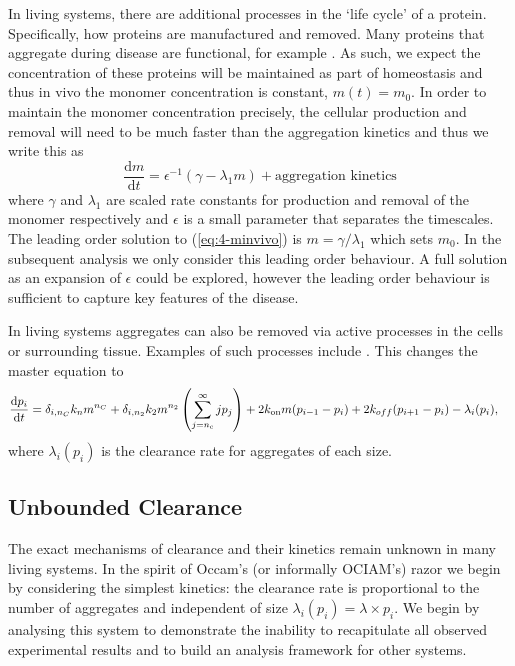 In living systems, there are additional processes in the `life cycle' of a protein. Specifically, how proteins are manufactured and removed. Many proteins that aggregate during disease are functional, for example . As such, we expect the concentration of these proteins will be maintained as part of homeostasis and thus in vivo the monomer concentration is constant, $m(t)=m_0$. In order to maintain the monomer concentration precisely, the cellular production and removal will need to be much faster than the aggregation kinetics and thus we write this as
\begin{equation}
    \frac{\text{d}m}{\text{d}t} = \epsilon^{-1}\left( \gamma - \lambda_1 m \right) + \text{aggregation kinetics}
    \label{eq:4-minvivo}
\end{equation}
where $\gamma$ and $\lambda_1$ are scaled rate constants for production and removal of the monomer respectively and $\epsilon$ is a small parameter that separates the timescales. The leading order solution to (\ref{eq:4-minvivo}) is $m=\gamma/\lambda_1$ which sets $m_0$. In the subsequent analysis we only consider this leading order behaviour. A full solution as an expansion of $\epsilon$ could be explored, however the leading order behaviour is sufficient to capture key features of the disease.

In living systems aggregates can also be removed via active processes in the cells or surrounding tissue. Examples of such processes include . This changes the master equation to
\begin{equation}
\begin{split}
    \frac{\text{d}p_i}{\text{d}t} &= \delta_{i, n_C}k_n m^{n_C} + \delta_{i, n_2} k_2 m^{n_2} \left(\sum_{j=n_{\mathrm{c}}}^{\infty} j p_j\right) + 2k_\text{on} m (p_{i-1}-p_i) + 2k_{off} (p_{i+1}-p_i) - \lambda_i(p_i),
    \end{split}
    \label{eq:4-pi_cleared}
\end{equation}
where $\lambda_i(p_i)$ is the clearance rate for aggregates of each size.

\subsection{Unbounded Clearance}

The exact mechanisms of clearance and their kinetics remain unknown in many living systems. In the spirit of Occam's (or informally OCIAM's) razor we begin by considering the simplest kinetics: the clearance rate is proportional to the number of aggregates and independent of size $\lambda_i(p_i)=\lambda \times p_i$. We begin by analysing this system to demonstrate the inability to recapitulate all observed experimental results and to build an analysis framework for other systems.


